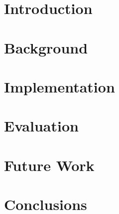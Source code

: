 
\chapter{Introduction}



\chapter{Background}



\chapter{Implementation}



\chapter{Evaluation}



\chapter{Future Work}



\chapter{Conclusions}

